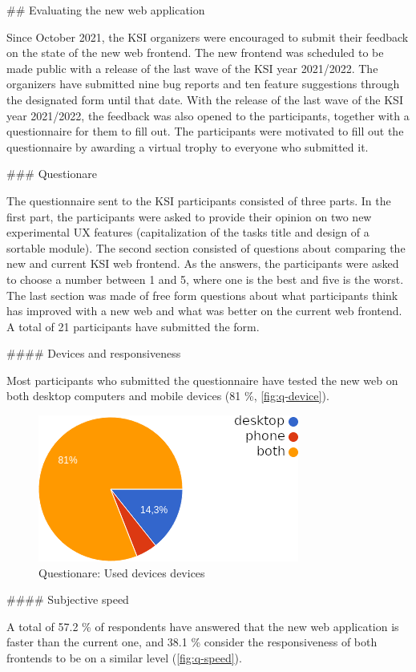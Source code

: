 \documentclass[
  digital, %
  oneside, %
  lof,     %
  nolot,     %
]{fithesis4}
\begin{document}
{## Evaluating the new web application

Since October 2021, the KSI organizers were encouraged to submit their feedback on the state of the new web frontend. The new frontend was scheduled to be made public with a release of the last wave of the KSI year 2021/2022. The organizers have submitted nine bug reports and ten feature suggestions through the designated form until that date. With the release of the last wave of the KSI year 2021/2022, the feedback was also opened to the participants, together with a questionnaire for them to fill out. The participants were motivated to fill out the questionnaire by awarding a virtual trophy to everyone who submitted it.

### Questionare

The questionnaire sent to the KSI participants consisted of three parts. In the first part, the participants were asked to provide their opinion on two new experimental UX features (capitalization of the tasks title and design of a sortable module). The second section consisted of questions about comparing the new and current KSI web frontend. As the answers, the participants were asked to choose a number between 1 and 5, where one is the best and five is the worst. The last section was made of free form questions about what participants think has improved with a new web and what was better on the current web frontend. A total of 21 participants have submitted the form.

#### Devices and responsiveness

Most participants who submitted the questionnaire have tested the new web on both desktop computers and mobile devices (81 \%, \autoref{fig:q-device}).

\begin{figure}
\includegraphics[width=.5\textwidth]{assets/img/questionare/device}
\caption{Questionare: Used devices devices}
\label{fig:q-device}
\end{figure}


#### Subjective speed

A total of 57.2 \% of respondents have answered that the new web application is faster than the current one, and 38.1 \% consider the responsiveness of both frontends to be on a similar level (\autoref{fig:q-speed}).

}
\end{document}
